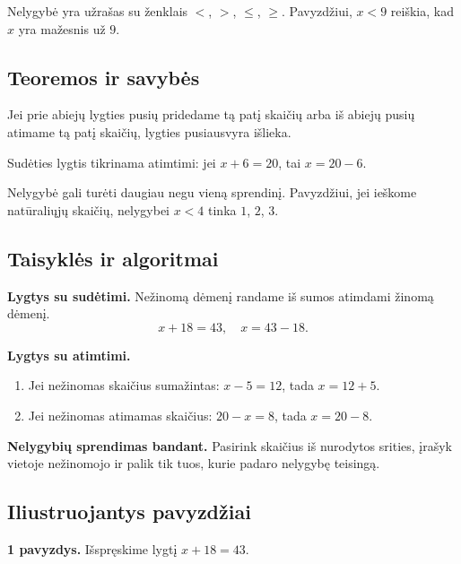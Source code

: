 \begin{apibreztis}
Nelygybė yra užrašas su ženklais \(<\), \(>\), \(\leq\), \(\geq\). Pavyzdžiui, \(x<9\) reiškia, kad \(x\) yra mažesnis už \(9\).
\end{apibreztis}

\subsection{Teoremos ir savybės}

\begin{savybe}
Jei prie abiejų lygties pusių pridedame tą patį skaičių arba iš abiejų pusių atimame tą patį skaičių, lygties pusiausvyra išlieka.
\end{savybe}

\begin{savybe}
Sudėties lygtis tikrinama atimtimi: jei \(x+6=20\), tai \(x=20-6\).
\end{savybe}

\begin{savybe}
Nelygybė gali turėti daugiau negu vieną sprendinį. Pavyzdžiui, jei ieškome natūraliųjų skaičių, nelygybei \(x<4\) tinka \(1\), \(2\), \(3\).
\end{savybe}

\subsection{Taisyklės ir algoritmai}

\textbf{Lygtys su sudėtimi.}
Nežinomą dėmenį randame iš sumos atimdami žinomą dėmenį.
\[
x+18=43,\quad x=43-18.
\]

\textbf{Lygtys su atimtimi.}
\begin{enumerate}[label=\arabic*.]
\item Jei nežinomas skaičius sumažintas: \(x-5=12\), tada \(x=12+5\).
\item Jei nežinomas atimamas skaičius: \(20-x=8\), tada \(x=20-8\).
\end{enumerate}

\textbf{Nelygybių sprendimas bandant.}
Pasirink skaičius iš nurodytos srities, įrašyk vietoje nežinomojo ir palik tik tuos, kurie padaro nelygybę teisingą.

\subsection{Iliustruojantys pavyzdžiai}

\textbf{1 pavyzdys.} Išspręskime lygtį \(x+18=43\).

